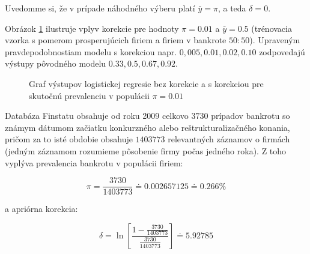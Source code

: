 Uvedomme si, že v prípade náhodného výberu platí \( \bar{y} = \pi \), a teda \( \delta = 0 \).

Obrázok \ref{correction_demo} ilustruje vplyv korekcie pre hodnoty \( \pi = 0.01 \) a \( \bar{y} = 0.5 \) (trénovacia vzorka s pomerom prosperujúcich firiem a firiem v bankrote \(50:50\)).
Upraveným pravdepodobnostiam modelu s korekciou napr. \(0,005, 0.01, 0.02, 0.10\) zodpovedajú výstupy pôvodného modelu \(0.33, 0.5, 0.67, 0.92\).

\begin{figure}
\caption{Graf výstupov logistickej regresie bez korekcie a s korekciou pre skutočnú prevalenciu v populácii \( \pi = 0.01\)}
\label{correction_demo}
\end{figure}

Databáza Finstatu obsahuje od roku 2009 celkovo \(3730\) prípadov bankrotu so známym dátumom začiatku konkurzného alebo reštrukturalizačného konania,
pričom za to isté obdobie obsahuje \(1 403 773\) relevantných záznamov o firmách (jedným záznamom rozumieme pôsobenie firmy počas jedného roka).
Z toho vyplýva prevalencia bankrotu v populácii firiem:

\[
    \pi = \frac{3730}{1403773} \doteq 0.002657125 \doteq 0.266 \%   
\]

a apriórna korekcia:

\[
    \delta = \ln \left[  \frac{1 - \frac{3730}{1403773}}{\frac{3730}{1403773}} \right] \doteq 5.92785
\]

